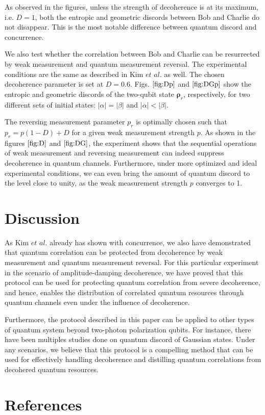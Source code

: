 \documentclass[%
 reprint,
 amsmath,amssymb,
 aps,
]{revtex4-1}
\begin{document}
As observed in the figures, unless the strength of decoherence is at its maximum, i.e. $D=1$, both the entropic and geometric discords between Bob and Charlie do not disappear. This is the most notable difference between quantum discord and concurrence. 

We also test whether the correlation between Bob and Charlie can be resurrected by weak measurement and quantum measurement reversal. The experimental conditions are the same as described in Kim $\textit{et al.}$ as well. The chosen decoherence parameter is set at $D=0.6$. Figs. $\ref{fig:Dp}$ and $\ref{fig:DGp}$ show the entropic and geometric discords of the two-qubit state $\boldsymbol{\rho}_r$, respectively, for two different sets of initial states: $|\alpha|=|\beta|$ and $|\alpha|<|\beta|$.

The reversing measurement parameter $p_r$ is optimally chosen such that $p_r=p(1-D)+D$ for a given weak measurement strength $p$. As shown in the figures $\ref{fig:D}$ and $\ref{fig:DG}$, the experiment shows that the sequential operations of weak measurement and reversing measurement can indeed suppress decoherence in quantum channels. Furthermore, under more optimized and ideal experimental conditions, we can even bring the amount of quantum discord to the level close to unity, as the weak measurement strength $p$ converges to 1.

\section{Discussion}
\noindent As Kim $\textit{et al.}$ already has shown with concurrence, we also have demonstrated that quantum correlation can be protected from decoherence by weak measurement and quantum measurement reversal. For this particular experiment in the scenario of amplitude-damping decoherence, we have proved that this protocol can be used for protecting quantum correlation from severe decoherence, and hence, enables the distribution of correlated quantum resources through quantum channels even under the influence of decoherence.

Furthermore, the protocol described in this paper can be applied to other types of quantum system beyond two-photon polarization qubits. For instance, there have been multiples studies done on quantum discord of Gaussian states. Under any scenarios, we believe that this protocol is a compelling method that can be used for effectively handling decoherence and distilling quantum correlations from decohered quantum resources. 

\section{References}
\lipsum[1-3]
\end{document}
